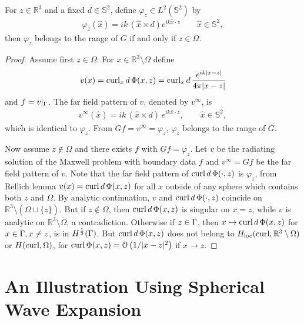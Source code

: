 \begin{prp}
  For $z\in\mathbb{R}^3$ and a fixed $d\in\mathbb{S}^2$, define $\varphi_z\in L^2(\mathbb{S}^2)$ by
  \begin{align*}
    \varphi_z(\hat{x}) = ik\,(\hat{x}\times d) e^{ik\hat{x}\cdot z}\qquad\hat{x}\in\mathbb{S}^2,
  \end{align*}
  then $\varphi_z$ belongs to the range of $G$ if and only if $z\in\Omega$.
\end{prp}

\begin{proof}
  Assume first $z\in\Omega$. For $x\in\mathbb{R}^3\setminus\Omega$ define
  \begin{align*}
    v(x)=\operatorname{curl}_x d\,\Phi(x, z)=\operatorname{curl}_x d\,\frac{e^{ik|x-z|}}{4\pi|x-z|}
  \end{align*}
  and $f=v|_\Gamma$. The far field pattern of $v$, denoted by $v^\infty$, is 
  \begin{align*}
    v^\infty(\hat{x}) = ik\,(\hat{x}\times d)\,e^{ik\hat{x}\cdot z},\qquad\hat{x}\in\mathbb{S}^2,
  \end{align*}
  which is identical to $\varphi_z$. From $Gf=v^\infty=\varphi_z$, $\varphi_z$ belongs to the range of $G$.  
  
  Now assume $z\not\in\Omega$ and there exists $f$ with $Gf=\varphi_z$. Let $v$ be the radiating solution of the Maxwell problem with boundary data $f$ and $v^\infty=Gf$ be the far field pattern of $v$. Note that the far field pattern of $\operatorname{curl} d\,\Phi(\cdot, z)$ is $\varphi_z$, from Rellich lemma $v(x)=\operatorname{curl} d\,\Phi(x, z)$ for all $x$ outside of any sphere which contains both $z$ and $\Omega$. By analytic continuation, $v$ and $\operatorname{curl} d\,\Phi(\cdot, z)$ coincide on $\mathbb{R}^3\setminus(\overline{\Omega}\cup\{z\})$. But if $z\not\in\overline{\Omega}$, then $\operatorname{curl} d\,\Phi(x, z)$ is singular on $x=z$, while $v$ is analytic on $\mathbb{R}^3\setminus\overline{\Omega}$, a contradiction. Otherwise if $z\in\Gamma$, then $x\mapsto\operatorname{curl} d\,\Phi(x, z)$ for $x\in\Gamma, x\neq z$, is in $H^{\frac{1}{2}}(\Gamma)$. But $\operatorname{curl} d\,\Phi(x, z)$ does not belong to $H_\text{loc}(\operatorname{curl}, \mathbb{R}^3\setminus\Omega)$ or $H(\operatorname{curl}, \Omega)$, for $\operatorname{curl}\Phi(x, z)=\mathcal{O}\left(1/|x-z|^2\right)$ if $x\to z$.

\end{proof}

\section{An Illustration Using Spherical Wave Expansion}

